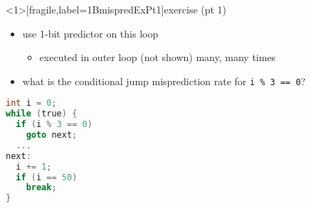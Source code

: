 
\begin{frame}<1>[fragile,label=1BmispredExPt1]{exercise (pt 1)}
\begin{itemize}
\item use 1-bit predictor on this loop
    \begin{itemize}
    \item executed in outer loop (not shown) many, many times
    \end{itemize}
\item what is the conditional jump misprediction rate for \verb|i % 3 == 0|?
\end{itemize}
\begin{lstlisting}[language=C,style=small]
int i = 0;
while (true) {
  if (i % 3 == 0)
    goto next; 
  ...
next:
  i += 1;
  if (i == 50)
    break; 
}
\end{lstlisting}
\end{frame}



